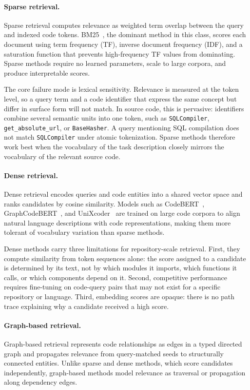 \paragraph{Sparse retrieval.}
Sparse retrieval computes relevance as weighted term overlap between the query and indexed code tokens. BM25~\cite{bm25}, the dominant method in this class, scores each document using term frequency (TF), inverse document frequency (IDF), and a saturation function that prevents high-frequency TF values from dominating. Sparse methods require no learned parameters, scale to large corpora, and produce interpretable scores.

The core failure mode is lexical sensitivity. Relevance is measured at the token level, so a query term and a code identifier that express the same concept but differ in surface form will not match. In source code, this is pervasive: identifiers combine several semantic units into one token, such as \texttt{SQLCompiler}, \texttt{get\_absolute\_url}, or \texttt{BaseHasher}. A query mentioning SQL compilation does not match \texttt{SQLCompiler} under atomic tokenization. Sparse methods therefore work best when the vocabulary of the task description closely mirrors the vocabulary of the relevant source code.

\paragraph{Dense retrieval.}
Dense retrieval encodes queries and code entities into a shared vector space and ranks candidates by cosine similarity. Models such as CodeBERT~\cite{codebert}, GraphCodeBERT~\cite{graphcodebert}, and UniXcoder~\cite{unixcoder} are trained on large code corpora to align natural language descriptions with code representations, making them more tolerant of vocabulary variation than sparse methods.

Dense methods carry three limitations for repository-scale retrieval. First, they compute similarity from token sequences alone: the score assigned to a candidate is determined by its text, not by which modules it imports, which functions it calls, or which components depend on it. Second, competitive performance requires fine-tuning on code-query pairs that may not exist for a specific repository or language. Third, embedding scores are opaque: there is no path trace explaining why a candidate received a high score.

\paragraph{Graph-based retrieval.}
Graph-based retrieval represents code relationships as edges in a typed directed graph and propagates relevance from query-matched seeds to structurally connected entities. Unlike sparse and dense methods, which score candidates independently, graph-based methods model relevance as traversal or propagation along dependency edges.

